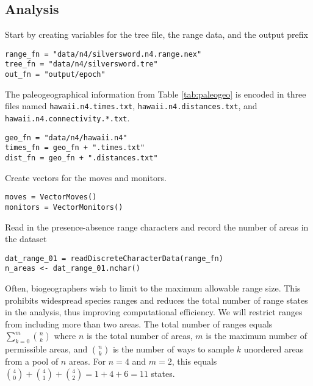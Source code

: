 \subsection{Analysis}

Start by creating variables for the tree file, the range data, and the output prefix

\begin{snugshade}
\begin{lstlisting}
range_fn = "data/n4/silversword.n4.range.nex"
tree_fn = "data/n4/silversword.tre"
out_fn = "output/epoch"
\end{lstlisting}
\end{snugshade}

The paleogeographical information from Table \ref{tab:paleogeo} is encoded in three files named {\tt hawaii.n4.times.txt}, {\tt hawaii.n4.distances.txt}, and {\tt hawaii.n4.connectivity.*.txt}.

\begin{snugshade}
\begin{lstlisting}
geo_fn = "data/n4/hawaii.n4"
times_fn = geo_fn + ".times.txt"
dist_fn = geo_fn + ".distances.txt"
\end{lstlisting}
\end{snugshade}


Create vectors for the moves and monitors.

\begin{snugshade}
\begin{lstlisting}
moves = VectorMoves()
monitors = VectorMonitors()
\end{lstlisting}
\end{snugshade}


Read in the presence-absence range characters and record the number of areas in the dataset

\begin{snugshade}
\begin{lstlisting}
dat_range_01 = readDiscreteCharacterData(range_fn)
n_areas <- dat_range_01.nchar()
\end{lstlisting}
\end{snugshade}

Often, biogeographers wish to limit to the maximum allowable range size.
This prohibits widespread species ranges and reduces the total number of range states in the analysis, thus improving computational efficiency.
We will restrict ranges from including more than two areas.
The total number of ranges equals $\sum_{k=0}^m {{n}\choose{k}}$ where $n$ is the total number of areas, $m$ is the maximum number of permissible areas, and ${{n}\choose{k}}$ is the number of ways to sample $k$ unordered areas from a pool of $n$ areas.
For $n=4$ and $m=2$, this equals ${{4}\choose{0}} + {{4}\choose{1}} + {{4}\choose{2}} = 1 + 4 + 6 = 11$ states.


